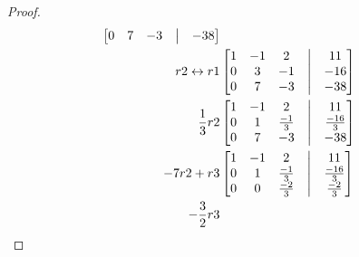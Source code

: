 \documentclass[12pt]{article}
\begin{document}
\begin{enumerate}
\begin{enumerate}
\begin{proof}
\begin{align*}
\begin{bmatrix}
                                                    0 & 7  & -3 & \bigm| & -38 \\
                                            \end{bmatrix} \\
                                            r2\leftrightarrow r1
                                             &
                                            \begin{bmatrix}
                                                    1 & -1 & 2  & \bigm| & 11  \\
                                                    0 & 3  & -1 & \bigm| & -16 \\
                                                    0 & 7  & -3 & \bigm| & -38 \\
                                            \end{bmatrix} \\
                                            \frac{1}{3}r2
                                             &
                                            \begin{bmatrix}
                                                    1 & -1 & 2            & \bigm| & 11            \\
                                                    0 & 1  & \frac{-1}{3} & \bigm| & \frac{-16}{3} \\
                                                    0 & 7  & -3           & \bigm| & -38           \\
                                            \end{bmatrix} \\
                                            -7r2+r3
                                             &
                                            \begin{bmatrix}
                                                    1 & -1 & 2            & \bigm| & 11            \\
                                                    0 & 1  & \frac{-1}{3} & \bigm| & \frac{-16}{3} \\
                                                    0 & 0  & \frac{-2}{3} & \bigm| & \frac{-2}{3}  \\
                                            \end{bmatrix} \\
                                            -\frac{3}{2}r3
                                             &

\end{align*}
\end{proof}
\end{enumerate}
\end{enumerate}
\end{document}
